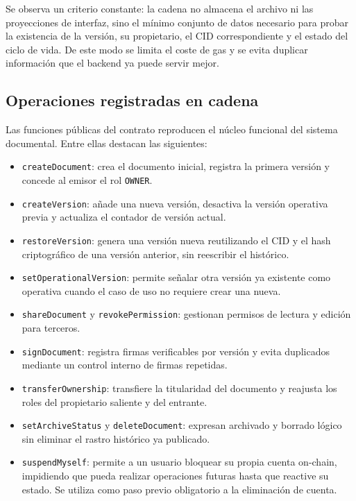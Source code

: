 \documentclass[11pt, a4paper]{article}
\begin{document}
Se observa un criterio constante: la cadena no almacena el archivo ni las proyecciones de interfaz, sino el mínimo conjunto de datos necesario para probar la existencia de la versión, su propietario, el CID correspondiente y el estado del ciclo de vida. De este modo se limita el coste de gas y se evita duplicar información que el backend ya puede servir mejor.

\subsection{Operaciones registradas en cadena}

Las funciones públicas del contrato reproducen el núcleo funcional del sistema documental. Entre ellas destacan las siguientes:

\begin{itemize}
    \item \texttt{createDocument}: crea el documento inicial, registra la primera versión y concede al emisor el rol \texttt{OWNER}.
    \item \texttt{createVersion}: añade una nueva versión, desactiva la versión operativa previa y actualiza el contador de versión actual.
    \item \texttt{restoreVersion}: genera una versión nueva reutilizando el CID y el hash criptográfico de una versión anterior, sin reescribir el histórico.
    \item \texttt{setOperationalVersion}: permite señalar otra versión ya existente como operativa cuando el caso de uso no requiere crear una nueva.
    \item \texttt{shareDocument} y \texttt{revokePermission}: gestionan permisos de lectura y edición para terceros.
    \item \texttt{signDocument}: registra firmas verificables por versión y evita duplicados mediante un control interno de firmas repetidas.
    \item \texttt{transferOwnership}: transfiere la titularidad del documento y reajusta los roles del propietario saliente y del entrante.
    \item \texttt{setArchiveStatus} y \texttt{deleteDocument}: expresan archivado y borrado lógico sin eliminar el rastro histórico ya publicado.
    \item \texttt{suspendMyself}: permite a un usuario bloquear su propia cuenta on-chain, impidiendo que pueda realizar operaciones futuras hasta que reactive su estado. Se utiliza como paso previo obligatorio a la eliminación de cuenta.
\end{itemize}
\end{document}
